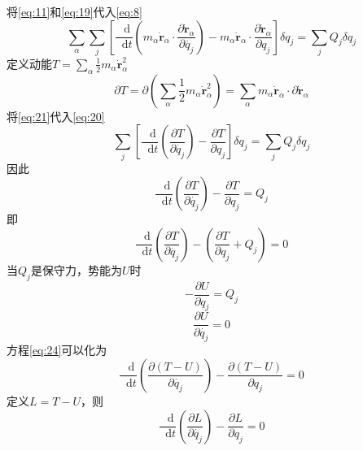 \documentclass{article}
\newcommand*{\dif}{\mathop{}\!\mathrm{d}}
\begin{document}
将\ref{eq:11}和\ref{eq:19}代入\ref{eq:8}
\begin{equation}
  \label{eq:20}
  \sum\limits_{\alpha} \sum\limits_{j} \left[ \frac{\dif}{\dif t} \left( m_{\alpha} \dot{\mathbf{r}}_{\alpha} \cdot \frac{\partial \dot{\mathbf{r}}_{\alpha}}{\partial \dot{q_{j}}} \right) -  m_{\alpha} \dot{\mathbf{r}}_{\alpha} \cdot  \frac{\partial \dot{\mathbf{r}}_{\alpha}}{\partial q_{j}} \right]\delta q_{j} = \sum\limits_{j} Q_{j} \delta q_{j}
\end{equation}
定义动能$T = \sum\limits_{\alpha} \frac{1}{2} m_{\alpha} \dot{\mathbf{r}}_{\alpha}^{2}$
\begin{equation}
  \label{eq:21}
  \partial T = \partial \left( \sum\limits_{\alpha} \frac{1}{2} m_{\alpha} \dot{\mathbf{r}}_{\alpha}^{2} \right) = \sum\limits_{\alpha} m_{\alpha} \dot{\mathbf{r}}_{\alpha} \cdot \partial \dot{\mathbf{r}}_{\alpha}
\end{equation}
将\ref{eq:21}代入\ref{eq:20}
\begin{equation}
  \label{eq:22}
  \sum\limits_{j} \left[ \frac{\dif}{\dif t} \left( \frac{\partial T}{\partial \dot{q_{j}}} \right) - \frac{\partial T}{\partial q_{j}} \right]\delta q_{j} = \sum\limits_{j} Q_{j} \delta q_{j}
\end{equation}
因此
\begin{equation}
  \label{eq:23}
  \frac{\dif}{\dif t} \left( \frac{\partial T}{\partial \dot{q_{j}}} \right) - \frac{\partial T}{\partial q_{j}} = Q_{j}
\end{equation}
即
\begin{equation}
  \label{eq:24}
  \frac{\dif}{\dif t} \left( \frac{\partial T}{\partial \dot{q_{j}}} \right) - \left( \frac{\partial T}{\partial q_{j}} + Q_{j} \right) = 0
\end{equation}
当$Q_{j}$是保守力，势能为$U$时
\begin{equation}
  \label{eq:25}
  -\frac{\partial U}{\partial q_{j}} = Q_{j}
\end{equation}
\begin{equation}
  \label{eq:26}
  \frac{\partial U}{\partial \dot{q_{j}}} = 0
\end{equation}
方程\ref{eq:24}可以化为
\begin{equation}
  \label{eq:27}
  \frac{\dif}{\dif t} \left( \frac{\partial (T-U)}{\partial \dot{q_{j}}} \right) - \frac{\partial (T-U)}{\partial q_{j}} = 0
\end{equation}
定义$L = T - U$，则
\begin{equation}
  \label{eq:28}
  \frac{\dif}{\dif t} \left( \frac{\partial L}{\partial \dot{q_{j}}} \right) - \frac{\partial L}{\partial q_{j}} = 0
\end{equation}
\end{document}
